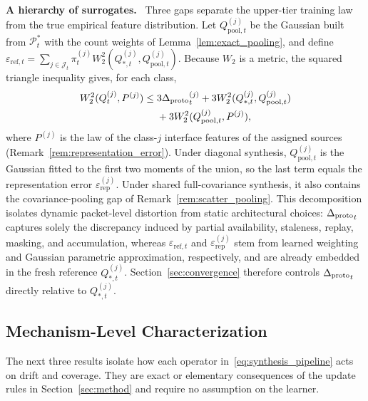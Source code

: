 \noindent\textbf{A hierarchy of surrogates.}~
Three gaps separate the upper-tier training law from the true empirical feature distribution. Let $Q_{\mathrm{pool},t}^{(j)}$ be the Gaussian built from $\mathcal P_t^*$ with the count weights of Lemma~\ref{lem:exact_pooling}, and define
$\varepsilon_{\mathrm{ref},t}=\sum_{j\in\mathcal J_t}\pi_t^{(j)}W_2^2(Q_{*,t}^{(j)},Q_{\mathrm{pool},t}^{(j)})$.
Because $W_2$ is a metric, the squared triangle inequality gives, for each class,
\begin{equation}
\begin{split}
 W_2^2(Q_t^{(j)},P^{(j)})
 \le{}&3{\Delta_{\mathrm{proto}}}_t^{(j)}
 +3W_2^2(Q_{*,t}^{(j)},Q_{\mathrm{pool},t}^{(j)})\\
 &+3W_2^2(Q_{\mathrm{pool},t}^{(j)},P^{(j)}),
\end{split}
\label{eq:surrogate_hierarchy}
\end{equation}
where $P^{(j)}$ is the law of the class-$j$ interface features of the assigned sources (Remark~\ref{rem:representation_error}). Under diagonal synthesis, $Q_{\mathrm{pool},t}^{(j)}$ is the Gaussian fitted to the first two moments of the union, so the last term equals the representation error $\varepsilon_{\mathrm{rep}}^{(j)}$. Under shared full-covariance synthesis, it also contains the covariance-pooling gap of Remark~\ref{rem:scatter_pooling}. This decomposition isolates dynamic packet-level distortion from static architectural choices: ${\Delta_{\mathrm{proto}}}_t$ captures solely the discrepancy induced by partial availability, staleness, replay, masking, and accumulation, whereas $\varepsilon_{\mathrm{ref},t}$ and $\varepsilon_{\mathrm{rep}}^{(j)}$ stem from learned weighting and Gaussian parametric approximation, respectively, and are already embedded in the fresh reference $Q_{*,t}^{(j)}$. Section~\ref{sec:convergence} therefore controls ${\Delta_{\mathrm{proto}}}_t$ directly relative to $Q_{*,t}^{(j)}$.

\subsection{Mechanism-Level Characterization}

The next three results isolate how each operator in~\eqref{eq:synthesis_pipeline} acts on drift and coverage. They are exact or elementary consequences of the update rules in Section~\ref{sec:method} and require no assumption on the learner.

